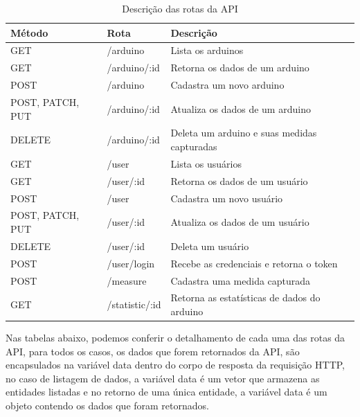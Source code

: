 \begin{table}[H]
    \centering
    \caption{Descrição das rotas da API}
    \label{table:table_api_routes}
    \begin{tabularx}{\textwidth}{l|l|l}
    \hline
    \textbf{Método}  & \textbf{Rota}        & \textbf{Descrição}                           \\ \hline
    GET              & /arduino             & Lista os arduinos                            \\ \hline
    GET              & /arduino/:id         & Retorna os dados de um arduino               \\ \hline
    POST             & /arduino             & Cadastra um novo arduino                     \\ \hline
    POST, PATCH, PUT & /arduino/:id         & Atualiza os dados de um arduino              \\ \hline
    DELETE           & /arduino/:id         & Deleta um arduino e suas medidas capturadas  \\ \hline
    GET              & /user                & Lista os usuários                            \\ \hline
    GET              & /user/:id            & Retorna os dados de um usuário               \\ \hline
    POST             & /user                & Cadastra um novo usuário                     \\ \hline
    POST, PATCH, PUT & /user/:id            & Atualiza os dados de um usuário              \\ \hline
    DELETE           & /user/:id            & Deleta um usuário                            \\ \hline
    POST             & /user/login          & Recebe as credenciais e retorna o token      \\ \hline
    POST             & /measure             & Cadastra uma medida capturada                \\ \hline
    GET              & /statistic/:id       & Retorna as estatísticas de dados do arduino  \\ \hline
    \end{tabularx}
\end{table}

Nas tabelas abaixo, podemos conferir o detalhamento de cada uma das rotas da API, para todos os casos, os dados que forem retornados da API, são encapsulados na variável data dentro do corpo de resposta da requisição HTTP, no caso de listagem de dados, a variável data é um vetor que armazena as entidades listadas e no retorno de uma única entidade, a variável data é um objeto contendo os dados que foram retornados.

